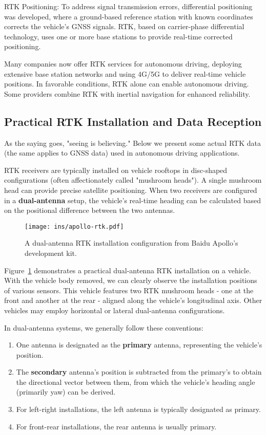 RTK Positioning: To address signal transmission errors, differential positioning was developed, where a ground-based reference station with known coordinates corrects the vehicle's GNSS signals. RTK, based on carrier-phase differential technology, uses one or more base stations to provide real-time corrected positioning.

Many companies now offer RTK services for autonomous driving, deploying extensive base station networks and using 4G/5G to deliver real-time vehicle positions. In favorable conditions, RTK alone can enable autonomous driving. Some providers combine RTK with inertial navigation for enhanced reliability.

\subsection{Practical RTK Installation and Data Reception}
As the saying goes, "seeing is believing." Below we present some actual RTK data (the same applies to GNSS data) used in autonomous driving applications.

RTK receivers are typically installed on vehicle rooftops in disc-shaped configurations (often affectionately called "mushroom heads"). A single mushroom head can provide precise satellite positioning. When two receivers are configured in a \textbf{dual-antenna} setup, the vehicle's real-time heading can be calculated based on the positional difference between the two antennas.

\begin{figure}
	\centering
	\texttt{[image: ins/apollo-rtk.pdf]}
	\caption{A dual-antenna RTK installation configuration from Baidu Apollo's development kit.}
	\label{fig:apollo-rtk}
\end{figure}

Figure~\ref{fig:apollo-rtk} demonstrates a practical dual-antenna RTK installation on a vehicle. With the vehicle body removed, we can clearly observe the installation positions of various sensors. This vehicle features two RTK mushroom heads - one at the front and another at the rear - aligned along the vehicle's longitudinal axis. Other vehicles may employ horizontal or lateral dual-antenna configurations.

In dual-antenna systems, we generally follow these conventions:
\begin{enumerate}
	\item One antenna is designated as the \textbf{primary} antenna, representing the vehicle's position.
	\item The \textbf{secondary} antenna's position is subtracted from the primary's to obtain the directional vector between them, from which the vehicle's heading angle (primarily yaw) can be derived.
	\item For left-right installations, the left antenna is typically designated as primary.
	\item For front-rear installations, the rear antenna is usually primary.
\end{enumerate}

